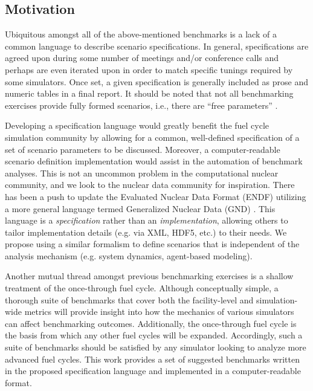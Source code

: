 \documentclass{anstrans}
\begin{document}
\subsection{Motivation}
Ubiquitous amongst all of the above-mentioned benchmarks is a lack of a common
language to describe scenario specifications. In general, specifications are
agreed upon during some number of meetings and/or conference calls and perhaps
are even iterated upon in order to match specific tunings required by some
simulators. Once set, a given specification is generally included as prose and
numeric tables in a final report. It should be noted that not all benchmarking
exercises provide fully formed scenarios, i.e., there are ``free parameters''
\cite{scopatz_fuel_2011}.

Developing a specification language would greatly benefit the fuel cycle
simulation community by allowing for a common, well-defined specification of a
set of scenario parameters to be discussed. Moreover, a computer-readable
scenario definition implementation would assist in the automation of benchmark
analyses. This is not an uncommon problem in the computational nuclear
community, and we look to the nuclear data community for inspiration. There has
been a push to update the Evaluated Nuclear Data Format (ENDF) utilizing a more
general language termed Generalized Nuclear Data (GND)
\cite{mattoon_generalized_2012}. This language is a \emph{specification} rather
than an \emph{implementation}, allowing others to tailor implementation details
(e.g. via XML, HDF5, etc.) to their needs. We propose using a similar formalism
to define scenarios that is independent of the analysis mechanism (e.g. system
dynamics, agent-based modeling).

Another mutual thread amongst previous benchmarking exercises is a shallow
treatment of the once-through fuel cycle. Although conceptually simple, a
thorough suite of benchmarks that cover both the facility-level and
simulation-wide metrics will provide insight into how the mechanics of various
simulators can affect benchmarking outcomes. Additionally, the once-through fuel
cycle is the basis from which any other fuel cycles will be expanded.
Accordingly, such a suite of benchmarks should be satisfied by any simulator
looking to analyze more advanced fuel cycles. This work provides a set of
suggested benchmarks written in the proposed specification language and
implemented in a computer-readable format.

\end{document}
